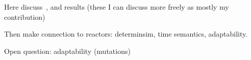 Here discuss~\cite{wittig_ict20}, and results (these I can discuss more freely as mostly my contribution)

Then make connection to reactors: determinsim, time semantics, adaptability.

Open question: adaptability (mutations)